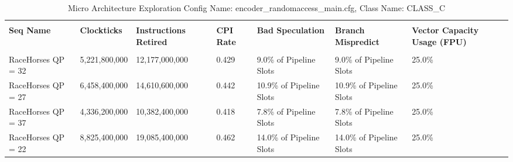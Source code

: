 \documentclass{article}%
\begin{document}
\newpage%
\begin{longtabu}{| X[l] | X[l] | X[l] | X[l] | X[l] | X[l] | X[l] |}%
\caption{%
Micro Architecture Exploration\newline%
 Config Name: encoder\_randomaccess\_main.cfg,\newline%
 Class Name: CLASS\_C\newline%
%
}%
\hline%
&&&&&&\\%
\textbf{Seq Name}&\textbf{Clockticks}&\textbf{Instructions Retired}&\textbf{CPI Rate}&\textbf{Bad Speculation}&\textbf{Branch Mispredict}&\textbf{Vector Capacity Usage (FPU)}\\%
&&&&&&\\%
\hline%
\endhead%
RaceHorses\newline%
 QP = 32&5,221,800,000&12,177,000,000&0.429&9.0\% of Pipeline Slots&9.0\% of Pipeline Slots&25.0\%\\%
\hline%
RaceHorses\newline%
 QP = 27&6,458,400,000&14,610,600,000&0.442&10.9\% of Pipeline Slots&10.9\% of Pipeline Slots&25.0\%\\%
\hline%
RaceHorses\newline%
 QP = 37&4,336,200,000&10,382,400,000&0.418&7.8\% of Pipeline Slots&7.8\% of Pipeline Slots&25.0\%\\%
\hline%
RaceHorses\newline%
 QP = 22&8,825,400,000&19,085,400,000&0.462&14.0\% of Pipeline Slots&14.0\% of Pipeline Slots&25.0\%\\%
\hline%
\end{longtabu}%
\end{document}

